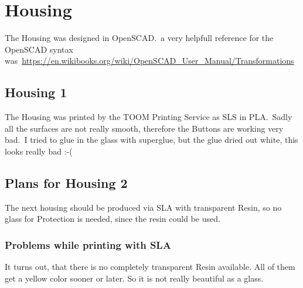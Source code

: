 \newpage
\section{Housing}
The Housing was designed in OpenSCAD.\
a very helpfull reference for the OpenSCAD syntax was\
\url{https://en.wikibooks.org/wiki/OpenSCAD_User_Manual/Transformations}

\subsection{Housing 1}
The Housing was printed by the TOOM Printing Service as SLS in PLA.\
Sadly all the surfaces are not really smooth, therefore the Buttons are working very bad.\
I tried to glue in the glass with superglue, but the glue dried out white, this looks really bad :-(\

\subsection{Plans for Housing 2}
The next housing should be produced via SLA with transparent Resin, so no glass for Protection is needed, 
since the resin could be used.
\subsubsection{Problems while printing with SLA}
It turns out, that there is no completely transparent Resin available. All of them get a yellow color sooner or later.
So it is not really beautiful as a glass.

